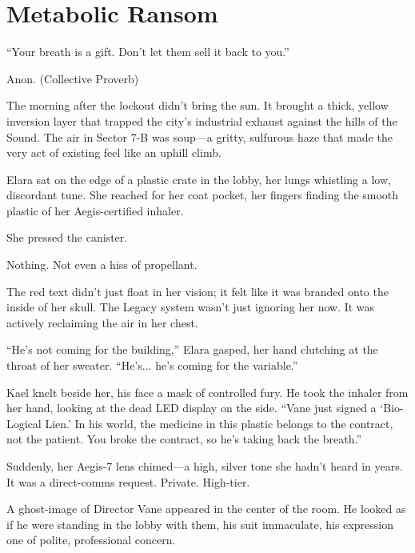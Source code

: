 
\chapter{Metabolic Ransom}
\epigraph{``Your breath is a gift. Don't let them sell it back to you.''}{Anon. (Collective Proverb)}

The morning after the lockout didn't bring the sun. It brought a thick, yellow inversion layer that trapped the city’s industrial exhaust against the hills of the Sound. The air in Sector 7-B was soup—a gritty, sulfurous haze that made the very act of existing feel like an uphill climb.

Elara sat on the edge of a plastic crate in the lobby, her lungs whistling a low, discordant tune. She reached for her coat pocket, her fingers finding the smooth plastic of her Aegis-certified inhaler. 

She pressed the canister. 

Nothing. Not even a hiss of propellant. 


The red text didn't just float in her vision; it felt like it was branded onto the inside of her skull. The Legacy system wasn't just ignoring her now. It was actively reclaiming the air in her chest. 

``He’s not coming for the building,'' Elara gasped, her hand clutching at the throat of her sweater. ``He’s... he’s coming for the variable.''

Kael knelt beside her, his face a mask of controlled fury. He took the inhaler from her hand, looking at the dead LED display on the side. ``Vane just signed a `Bio-Logical Lien.' In his world, the medicine in this plastic belongs to the contract, not the patient. You broke the contract, so he’s taking back the breath.''



Suddenly, her Aegis-7 lens chimed—a high, silver tone she hadn't heard in years. It was a direct-comms request. Private. High-tier. 

A ghost-image of Director Vane appeared in the center of the room. He looked as if he were standing in the lobby with them, his suit immaculate, his expression one of polite, professional concern. 

